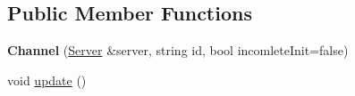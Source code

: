 \subsection*{Public Member Functions}
\begin{DoxyCompactItemize}
\item 
{\bfseries Channel} (\hyperlink{class_ts3_api_1_1_server}{Server} \&server, string id, bool incomlete\+Init=false)\hypertarget{class_ts3_api_1_1_channel_a6b09dc4ce2d937ef2e9c5be0a1f6f921}{}\label{class_ts3_api_1_1_channel_a6b09dc4ce2d937ef2e9c5be0a1f6f921}

\item 
void \hyperlink{class_ts3_api_1_1_channel_a46a6b75a6034ebac72a4868ed943ad05}{update} ()\hypertarget{class_ts3_api_1_1_channel_a46a6b75a6034ebac72a4868ed943ad05}{}\label{class_ts3_api_1_1_channel_a46a6b75a6034ebac72a4868ed943ad05}


\end{DoxyCompactItemize}
